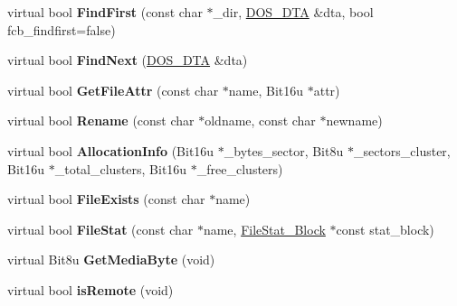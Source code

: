\begin{DoxyCompactItemize}
\item 
\hypertarget{classfatDrive_ae6a1a651216a72b1aa23172aca4793db}{virtual bool {\bfseries Find\-First} (const char $\ast$\-\_\-dir, \hyperlink{classDOS__DTA}{D\-O\-S\-\_\-\-D\-T\-A} \&dta, bool fcb\-\_\-findfirst=false)}\label{classfatDrive_ae6a1a651216a72b1aa23172aca4793db}

\item 
\hypertarget{classfatDrive_aa42a5640691796f7d1fef063b92dc418}{virtual bool {\bfseries Find\-Next} (\hyperlink{classDOS__DTA}{D\-O\-S\-\_\-\-D\-T\-A} \&dta)}\label{classfatDrive_aa42a5640691796f7d1fef063b92dc418}

\item 
\hypertarget{classfatDrive_a5849a5af82e7d7a273e6096aa08d220b}{virtual bool {\bfseries Get\-File\-Attr} (const char $\ast$name, Bit16u $\ast$attr)}\label{classfatDrive_a5849a5af82e7d7a273e6096aa08d220b}

\item 
\hypertarget{classfatDrive_a280a53447052bc89d35e281e3180c281}{virtual bool {\bfseries Rename} (const char $\ast$oldname, const char $\ast$newname)}\label{classfatDrive_a280a53447052bc89d35e281e3180c281}

\item 
\hypertarget{classfatDrive_a89089651094073f2d5257e187fe10403}{virtual bool {\bfseries Allocation\-Info} (Bit16u $\ast$\-\_\-bytes\-\_\-sector, Bit8u $\ast$\-\_\-sectors\-\_\-cluster, Bit16u $\ast$\-\_\-total\-\_\-clusters, Bit16u $\ast$\-\_\-free\-\_\-clusters)}\label{classfatDrive_a89089651094073f2d5257e187fe10403}

\item 
\hypertarget{classfatDrive_a87594730a6f5c10a579a9e236ada21e9}{virtual bool {\bfseries File\-Exists} (const char $\ast$name)}\label{classfatDrive_a87594730a6f5c10a579a9e236ada21e9}

\item 
\hypertarget{classfatDrive_a10053899bc9ca84a4c99ca5ee5c0716e}{virtual bool {\bfseries File\-Stat} (const char $\ast$name, \hyperlink{structFileStat__Block}{File\-Stat\-\_\-\-Block} $\ast$const stat\-\_\-block)}\label{classfatDrive_a10053899bc9ca84a4c99ca5ee5c0716e}

\item 
\hypertarget{classfatDrive_ad9980844fab3303927f2118d02d55147}{virtual Bit8u {\bfseries Get\-Media\-Byte} (void)}\label{classfatDrive_ad9980844fab3303927f2118d02d55147}

\item 
\hypertarget{classfatDrive_a99edbe351256de3a70e3260fd9bf8df1}{virtual bool {\bfseries is\-Remote} (void)}\label{classfatDrive_a99edbe351256de3a70e3260fd9bf8df1}


\end{DoxyCompactItemize}
